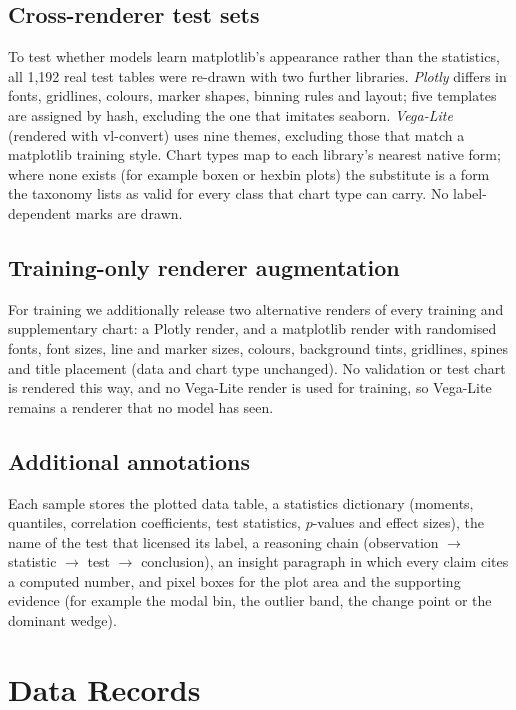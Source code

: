 \documentclass[11pt,a4paper]{article}
\begin{document}
\subsection*{Cross-renderer test sets}
To test whether models learn matplotlib's appearance rather than the statistics, all
1{,}192 real test tables were re-drawn with two further libraries. \emph{Plotly}\cite{plotly}
differs in fonts, gridlines, colours, marker shapes, binning rules and layout; five
templates are assigned by hash, excluding the one that imitates seaborn.
\emph{Vega-Lite} (rendered with vl-convert) uses nine themes, excluding those that
match a matplotlib training style. Chart types map to each library's nearest native
form; where none exists (for example boxen or hexbin plots) the substitute is a form
the taxonomy lists as valid for every class that chart type can carry. No
label-dependent marks are drawn.

\subsection*{Training-only renderer augmentation}
For training we additionally release two alternative renders of every training and
supplementary chart: a Plotly render, and a matplotlib render with randomised fonts,
font sizes, line and marker sizes, colours, background tints, gridlines, spines and
title placement (data and chart type unchanged). No validation or test chart is
rendered this way, and no Vega-Lite render is used for training, so Vega-Lite remains
a renderer that no model has seen.

\subsection*{Additional annotations}
Each sample stores the plotted data table, a statistics dictionary (moments, quantiles,
correlation coefficients, test statistics, $p$-values and effect sizes), the name of
the test that licensed its label, a reasoning chain (observation $\rightarrow$
statistic $\rightarrow$ test $\rightarrow$ conclusion), an insight paragraph in which
every claim cites a computed number, and pixel boxes for the plot area and the
supporting evidence (for example the modal bin, the outlier band, the change point or
the dominant wedge).

\section*{Data Records}
\end{document}
